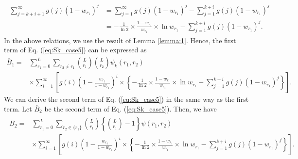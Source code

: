 \begin{align}\begin{split}
  \sum_{j=k+i+1}^{\infty} g(j) (1-w_{r_1})^j 
  &= \sum_{j=1}^{\infty} g(j)(1-w_{r_1})^{j} - \sum_{j=1}^{k+i} g(j)(1-w_{r_1})^{j} \\
  &= -\frac{1}{\ln 2} \times \frac{1-w_{r_1}}{w_{r_1}} \times \ln w_{r_1} - \sum_{j=1}^{k+i} g(j)(1-w_{r_1})^{j}.
\end{split}\end{align}
In the above relations, we use the result of Lemma \ref{lemma:1}.
Hence, the first term of Eq. (\ref{eq:Sk_case5}) can be expressed as
\begin{align}
  \overline{B}_1 
  =& \sum_{r_1=0}^{L} \sum_{r_2 \neq r_1} \binom{L}{r_1}\binom{L}{r_2}\psi_k(r_1,r_2)\\
  &\times\sum_{i=1}^{\infty} \left[ g(i) \left(1-\frac{w_{r_2}}{1-w_{r_1}} \right)^{i} \times \left\{ -\frac{1}{\ln 2} \times \frac{1-w_{r_1}}{w_{r_1}} \times \ln w_{r_1} - \sum_{j=1}^{k+i} g(j)(1-w_{r_1})^{j} \right\} \right].
\end{align}
We can derive the second term of Eq. (\ref{eq:Sk_case5}) in the same way as the first term. Let $\overline{B}_2$ be the second term of Eq. (\ref{eq:Sk_case5}). Then, we have
\begin{align}\begin{split}
  \overline{B}_2 =& \sum_{r_1=0}^{L} \sum_{r_2 \in \{r_1\}} \binom{L}{r_1}\left\{\binom{L}{r_1}-1\right\} \psi(r_1,r_2) \\
  &\times\sum_{i=1}^{\infty} \left[ g(i) \left(1-\frac{w_{r_2}}{1-w_{r_1}} \right)^{i} \times \left\{ -\frac{1}{\ln 2} \times \frac{1-w_{r_1}}{w_{r_1}} \times \ln w_{r_1} - \sum_{j=1}^{k+i} g(j)(1-w_{r_1})^{j} \right\} \right].
\end{split}\end{align}
